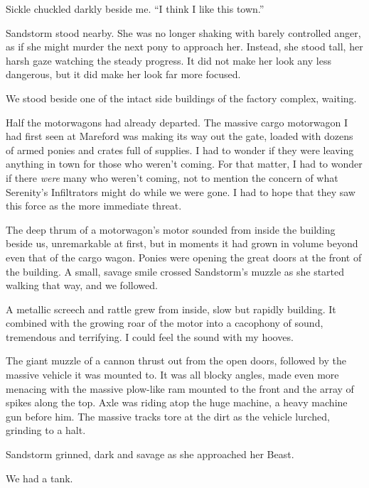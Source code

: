 Sickle chuckled darkly beside me. “I think I like this town.”

Sandstorm stood nearby. She was no longer shaking with barely controlled anger, as if she might murder the next pony to approach her. Instead, she stood tall, her harsh gaze watching the steady progress. It did not make her look any less dangerous, but it did make her look far more focused.

We stood beside one of the intact side buildings of the factory complex, waiting.

Half the motorwagons had already departed. The massive cargo motorwagon I had first seen at Mareford was making its way out the gate, loaded with dozens of armed ponies and crates full of supplies. I had to wonder if they were leaving anything in town for those who weren’t coming. For that matter, I had to wonder if there \textit{were} many who weren’t coming, not to mention the concern of what Serenity’s Infiltrators might do while we were gone. I had to hope that they saw this force as the more immediate threat.

The deep thrum of a motorwagon’s motor sounded from inside the building beside us, unremarkable at first, but in moments it had grown in volume beyond even that of the cargo wagon. Ponies were opening the great doors at the front of the building. A small, savage smile crossed Sandstorm’s muzzle as she started walking that way, and we followed.

A metallic screech and rattle grew from inside, slow but rapidly building. It combined with the growing roar of the motor into a cacophony of sound, tremendous and terrifying. I could feel the sound with my hooves.

The giant muzzle of a cannon thrust out from the open doors, followed by the massive vehicle it was mounted to. It was all blocky angles, made even more menacing with the massive plow-like ram mounted to the front and the array of spikes along the top. Axle was riding atop the huge machine, a heavy machine gun before him. The massive tracks tore at the dirt as the vehicle lurched, grinding to a halt.

Sandstorm grinned, dark and savage as she approached her Beast.

We had a tank.